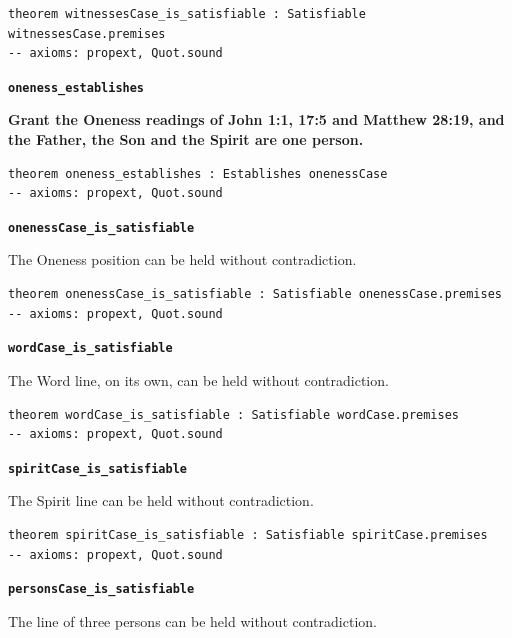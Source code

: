 \documentclass[11pt,paper=\testimonypaper,DIV=13,parskip=false]{scrartcl}
\begin{document}
{\small\begin{verbatim}
theorem witnessesCase_is_satisfiable : Satisfiable witnessesCase.premises
-- axioms: propext, Quot.sound
\end{verbatim}}
\par\medskip\noindent\textbf{\texttt{oneness\_\allowbreak{}establishes}}\par\nobreak\noindent
\textbf{Grant the Oneness readings of John 1:1, 17:5 and Matthew 28:19, and the Father, the Son and the Spirit are one person.}

{\small\begin{verbatim}
theorem oneness_establishes : Establishes onenessCase
-- axioms: propext, Quot.sound
\end{verbatim}}
\par\medskip\noindent\textbf{\texttt{oneness\allowbreak{}Case\_\allowbreak{}is\_\allowbreak{}satisfiable}}\par\nobreak\noindent
The Oneness position can be held without contradiction.

{\small\begin{verbatim}
theorem onenessCase_is_satisfiable : Satisfiable onenessCase.premises
-- axioms: propext, Quot.sound
\end{verbatim}}
\par\medskip\noindent\textbf{\texttt{word\allowbreak{}Case\_\allowbreak{}is\_\allowbreak{}satisfiable}}\par\nobreak\noindent
The Word line, on its own, can be held without contradiction.

{\small\begin{verbatim}
theorem wordCase_is_satisfiable : Satisfiable wordCase.premises
-- axioms: propext, Quot.sound
\end{verbatim}}
\par\medskip\noindent\textbf{\texttt{spirit\allowbreak{}Case\_\allowbreak{}is\_\allowbreak{}satisfiable}}\par\nobreak\noindent
The Spirit line can be held without contradiction.

{\small\begin{verbatim}
theorem spiritCase_is_satisfiable : Satisfiable spiritCase.premises
-- axioms: propext, Quot.sound
\end{verbatim}}
\par\medskip\noindent\textbf{\texttt{persons\allowbreak{}Case\_\allowbreak{}is\_\allowbreak{}satisfiable}}\par\nobreak\noindent
The line of three persons can be held without contradiction.
\end{document}
